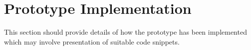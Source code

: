 \section{Prototype Implementation}
\label{sec:implementation}

This section should provide details of how the prototype has been implemented which may involve presentation of suitable code snippets.

